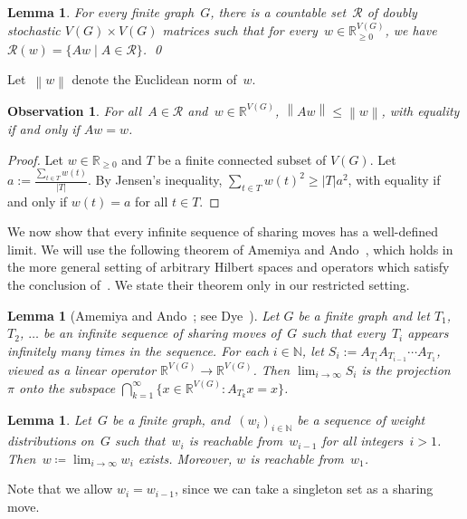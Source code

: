 \documentclass[reqno, 12pt]{amsart}
\numberwithin{equation}{section}
\numberwithin{figure}{section}
\theoremstyle{plain}
\newtheorem{lemma}[thm]{Lemma}
\newtheorem{lem}[thm]{Lemma}
\newtheorem{observation}[thm]{Observation}
\theoremstyle{definition}
\newcommand{\norm}[1]{\ensuremath{\left\lVert {#1} \right\rVert}}
\begin{document}
\begin{lemma}
    \label{lem:matrices}
     For every finite graph~$G$, there is a countable set~$\mathcal{R}$ of doubly stochastic $V(G) \times V(G)$ matrices such that for every~$w \in \mathbb{R}_{\geq 0}^{V(G)}$, we have~$\mathcal{R}(w) = \{ Aw \mid A \in \mathcal{R} \}$. \qed
\end{lemma}

Let~$\norm{w}$ denote the Euclidean norm of~$w$.  

\begin{observation}
    \label{obs:normdecreasing}
    For all~${A \in \mathcal{R}}$ and~${w \in \mathbb{R}^{V(G)}}$, ${\norm{Aw} \leq \norm{w}}$,  with equality if and only if $Aw=w$.
\end{observation}

\begin{proof}
Let $w \in \mathbb{R}_{\geq 0}$ and $T$ be a finite connected subset of $V(G)$.  Let $a:=\frac{\sum_{t \in T} w(t)}{|T|}$.  By Jensen's inequality, $\sum_{t \in T} w(t)^2 \geq |T|a^2$, with equality if and only if $w(t)=a$ for all $t \in T$.  
\end{proof}

We now show that every infinite sequence of sharing moves has a well-defined limit.  We will use the following theorem of Amemiya and Ando~\cite{AA1965}, which holds in the more general setting of arbitrary Hilbert spaces and operators which satisfy the conclusion of~. We state their theorem only in our restricted setting.

\begin{lemma}[Amemiya and Ando~\cite{AA1965}; see Dye~\cite{Dye1989}]\label{lem:aa}
    Let $G$ be a finite graph and let $T_1$, $T_2$, $\ldots$ be an infinite sequence of sharing moves of~$G$ such that every~$T_i$ appears infinitely many times in the sequence. For each $i \in \mathbb{N}$, let $S_i:=A_{T_i}A_{T_{i-1}}\cdots A_{T_{1}}$, viewed as a linear operator $\mathbb{R}^{V(G)} \to \mathbb{R}^{V(G)}$. Then $\lim_{i \to \infty}S_i$ is the projection~$\pi$ onto the subspace $\bigcap_{k=1}^\infty \{x\in \mathbb{R}^{V(G)}: A_{T_{k}} x= x\}$.
\end{lemma}
\begin{lem}\label{converge}
    Let~$G$ be a finite graph, and~${(w_i)_{i \in \mathbb{N}}}$ be a sequence of weight distributions on~$G$ such that~$w_i$ is reachable from~$w_{i-1}$ for all integers~${i>1}$. 
    Then~${w \coloneqq \lim_{i \to \infty} w_i}$ exists. 
    Moreover, $w$ is reachable from~$w_1$. 
\end{lem}
Note that we allow $w_i=w_{i-1}$, since we can take a singleton set as a sharing move.  
\end{document}
